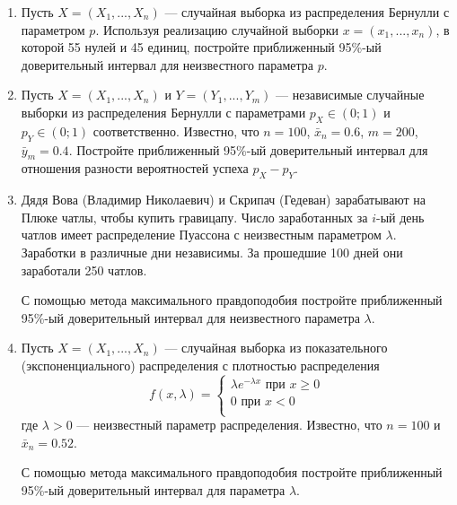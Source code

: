 \documentclass[12pt]{article}
\begin{document}
\begin{enumerate}
\item Пусть $X = (X_{1},..., X_{n})$ — случайная выборка из распределения Бернулли с параметром $p$. Используя реализацию случайной выборки $x = (x_{1},..., x_{n})$, в которой 55 нулей и 45 единиц, постройте приближенный 95\%-ый доверительный интервал для неизвестного параметра $p$.

\item Пусть $X = (X_{1},..., X_{n})$ и $Y = (Y_{1},..., Y_{m})$ — независимые случайные
выборки из распределения Бернулли с параметрами $p_{X} \in (0;1)$ и $p_{Y} \in (0;1)$ соответственно. Известно, что $n = 100$, $\bar{x}_{n} = 0.6$, $m = 200$, $\bar{y}_{m} = 0.4$. Постройте приближенный 95\%-ый доверительный интервал для отношения разности вероятностей успеха $p_{X} - p_{Y}$.

\item Дядя Вова (Владимир Николаевич) и Скрипач (Гедеван) зарабатывают на Плюке чатлы, чтобы купить гравицапу. Число заработанных за $i$-ый день чатлов имеет распределение Пуассона с неизвестным параметром $\lambda$. Заработки в различные дни независимы. За прошедшие 100 дней они заработали 250 чатлов.

С помощью метода максимального правдоподобия постройте приближенный 95\%-ый доверительный интервал для неизвестного параметра $\lambda$.

\item Пусть $X = (X_{1},..., X_{n})$ — случайная выборка из показательного (экспоненциального) распределения с плотностью распределения
\[
f(x,\lambda)=
\begin{cases}
\lambda e^{-\lambda x}\text{ при } x\geq 0 \\
0 \text{ при } x < 0 \\
\end{cases}
\]
где $\lambda > 0$ — неизвестный параметр распределения. Известно, что $n = 100$ и $\bar{x}_n = 0.52$.

С помощью метода максимального правдоподобия постройте приближенный 95\%-ый доверительный интервал для параметра $\lambda$.





\end{enumerate}
\end{document}
